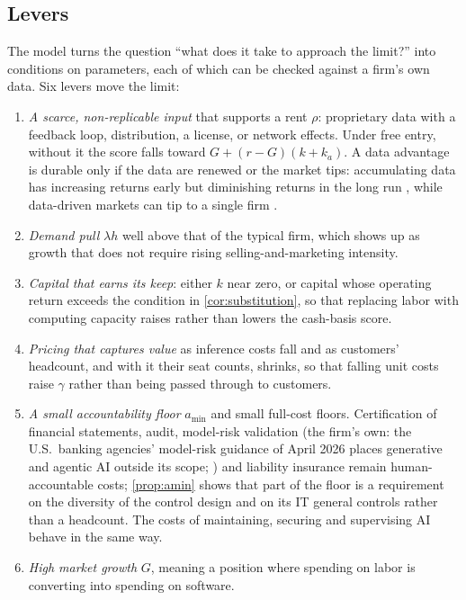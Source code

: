 \subsection{Levers}
The model turns the question ``what does it take to approach the limit?'' into conditions on parameters, each of which can be checked against a firm's own data. Six levers move the limit:
\begin{enumerate}
\item \emph{A scarce, non-replicable input} that supports a rent $\rho$: proprietary data with a feedback loop, distribution, a license, or network effects. Under free entry, without it the score falls toward $G+(r-G)(k+k_a)$. A data advantage is durable only if the data are renewed or the market tips: accumulating data has increasing returns early but diminishing returns in the long run \citep{farboodi2021model}, while data-driven markets can tip to a single firm \citep{prufer2021competing}.
\item \emph{Demand pull} $\lambda h$ well above that of the typical firm, which shows up as growth that does not require rising selling-and-marketing intensity.
\item \emph{Capital that earns its keep}: either $k$ near zero, or capital whose operating return exceeds the condition in \autoref{cor:substitution}, so that replacing labor with computing capacity raises rather than lowers the cash-basis score.
\item \emph{Pricing that captures value} as inference costs fall and as customers' headcount, and with it their seat counts, shrinks, so that falling unit costs raise $\gamma$ rather than being passed through to customers.
\item \emph{A small accountability floor} $a_{\min}$ and small full-cost floors. Certification of financial statements, audit, model-risk validation (the firm's own: the U.S.\ banking agencies' model-risk guidance of April 2026 places generative and agentic AI outside its scope; \citealp{fed2026sr262,occ2026bulletin13}) and liability insurance remain human-accountable costs; \autoref{prop:amin} shows that part of the floor is a requirement on the diversity of the control design and on its IT general controls rather than a headcount. The costs of maintaining, securing and supervising AI behave in the same way.
\item \emph{High market growth} $G$, meaning a position where spending on labor is converting into spending on software.
\end{enumerate}

